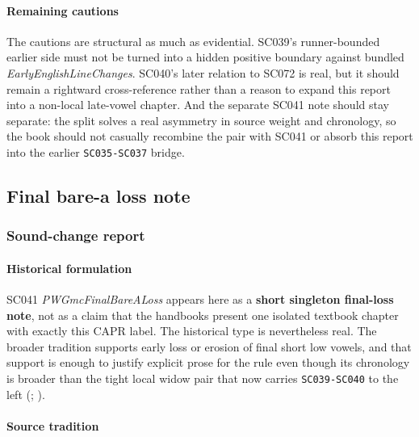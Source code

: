 \documentclass[
  british,
  a4paper,
]{article}
\begin{document}
\paragraph{Remaining cautions}\label{remaining-cautions-24}

The cautions are structural as much as evidential. SC039's
runner-bounded earlier side must not be turned into a hidden positive
boundary against bundled \emph{EarlyEnglishLineChanges}. SC040's later
relation to SC072 is real, but it should remain a rightward
cross-reference rather than a reason to expand this report into a
non-local late-vowel chapter. And the separate SC041 note should stay
separate: the split solves a real asymmetry in source weight and
chronology, so the book should not casually recombine the pair with
SC041 or absorb this report into the earlier \texttt{SC035-SC037}
bridge.

\subsection{Final bare-a loss note}\label{final-bare-a-loss-note}

\subsubsection{Sound-change report}\label{sound-change-report-25}

\paragraph{Historical formulation}\label{historical-formulation-25}

SC041 \emph{PWGmcFinalBareALoss} appears here as a \textbf{short
singleton final-loss note}, not as a claim that the handbooks present
one isolated textbook chapter with exactly this CAPR label. The
historical type is nevertheless real. The broader tradition supports
early loss or erosion of final short low vowels, and that support is
enough to justify explicit prose for the rule even though its chronology
is broader than the tight local widow pair that now carries
\texttt{SC039-SC040} to the left (; ).

\paragraph{Source tradition}\label{source-tradition-25}
\end{document}
